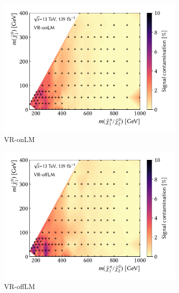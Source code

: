 \begin{figure}
	\centering
	\begin{subfigure}[b]{0.5\linewidth}
		\centering\includegraphics[width=1.0\textwidth]{signal_contamination/plot_VR_onLM}
		\caption{VR-onLM\label{fig:signal_contamination_VRon1}}
	\end{subfigure}\hfill
	\begin{subfigure}[b]{0.5\linewidth}
		\centering\includegraphics[width=1.0\textwidth]{signal_contamination/plot_VR_offLM}
		\caption{VR-offLM\label{fig:signal_contamination_VRoff1}}
	\end{subfigure}\hfill
	\par\medskip
	\begin{subfigure}[b]{0.5\linewidth}

\end{subfigure}
\end{figure}
